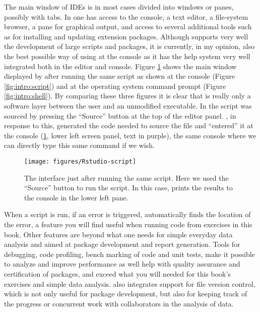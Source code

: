 \documentclass[krantz2]{krantz}\usepackage{knitr}
\begin{document}
The main window of IDEs is in most cases divided into windows or panes, possibly with tabs. In \RStudio one has access to the \Rpgrm console, a text editor, a file-system browser, a pane for graphical output, and access to several additional tools such as for installing and updating extension packages. Although \RStudio supports very well the development of large scripts and packages, it is currently, in my opinion, also the best possible way of using \Rpgrm at the console as it has the \Rpgrm help system very well integrated both in the editor and \Rlang console. Figure \ref{fig:intro:rstudio} shows the main window displayed by \RStudio after running the same script as shown at the \Rpgrm console (Figure \ref{fig:intro:script}) and at the operating system command prompt (Figure \ref{fig:intro:shell}). By comparing these three figures it is clear that \RStudio is really only a software layer between the user and an unmodified \Rpgrm executable. In \RStudio the script was sourced by pressing the ``Source'' button at the top of the editor panel. \RStudio, in response to this, generated the code needed to source the file and ``entered'' it at the console (\ref{fig:intro:rstudio}, lower left screen panel, text in purple), the same console where we can directly type this same \Rpgrm command if we wish.

\begin{figure}
  \centering
  \texttt{[image: figures/Rstudio-script]}
  \caption[Script in Rstudio]{The \RStudio interface just after running the same script. Here we used the ``Source'' button to run the script. In this case, \Rpgrm prints the results to the \Rpgrm console in the lower left pane.}\label{fig:intro:rstudio}
\end{figure}

\begin{explainbox}
When a script is run, if an error is triggered, \RStudio automatically finds the location of the error, a feature you will find useful when running code from exercises in this book. Other features are beyond what one needs for simple everyday data analysis and aimed at package development and report generation. Tools for debugging, code profiling, bench marking of code and unit tests, make it possible to analyze and improve performance as well help with quality assurance and certification of \Rlang packages, and exceed what you will needed for this book's exercises and simple data analysis. \RStudio also integrates support for file version control, which is not only useful for package development, but also for keeping track of the progress or concurrent work with collaborators in the analysis of data.
\end{explainbox}
\end{document}
